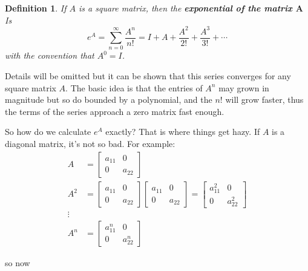\documentclass[letterpaper, 11pt, openany]{book}
\theoremstyle{mytheoremstyle}
\newtheorem{definition}{Definition}[section]
\theoremstyle{myexamplestyle}
\begin{document}
\begin{definition}\label{d:matrix-exp}
    If \(A\) is a square matrix, then the \textbf{exponential of the matrix \(\bm{A}\)} Is
    \[e^{A} = \sum_{n=0}^{\infty} \frac{A^{n}}{n!} = I + A + \frac{A^{2}}{2!} + \frac{A^{3}}{3!} + \cdots\]
    with the convention that \(A^{0} = I\).
\end{definition}
Details will be omitted but it can be shown that this series converges for any square matrix \(A\). The basic idea is that the entries of \(A^{n}\) may grown in magnitude but so do bounded by a polynomial, and the \(n!\) will grow faster, thus the terms of the series approach a zero matrix fast enough.

So how do we calculate \(e^{A}\) exactly? That is where things get hazy. If \(A\) is a diagonal matrix, it's not so bad. For example:
\begin{align*}
    A &= \begin{bmatrix}
        a_{11} & 0\\
        0 & a_{22}
    \end{bmatrix} \\
    A^{2} &= \begin{bmatrix}
        a_{11} & 0\\
        0 & a_{22}
    \end{bmatrix}\begin{bmatrix}
        a_{11} & 0\\
        0 & a_{22}
    \end{bmatrix} =
    \begin{bmatrix}
        a_{11}^{2} & 0\\
        0 & a_{22}^{2}
    \end{bmatrix}\\
    \vdots\\
    A^{n} &= \begin{bmatrix}
        a_{11}^{n} & 0\\
        0 & a_{22}^{n}
    \end{bmatrix}
\end{align*}

so now
\end{document}
